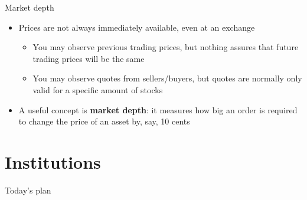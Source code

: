 \documentclass[english,10pt
,aspectratio=169
]{beamer}
\begin{document}
\begin{frame}{Market depth}
\begin{itemize}
	\item Prices are not always immediately available, even at an exchange
	\begin{itemize}
		\item You may observe previous trading prices, but nothing assures that future trading prices will be the same
		\item You may observe quotes from sellers/buyers, but quotes are normally only valid for a specific amount of stocks
	\end{itemize}
	\item A useful concept is \textbf{market depth}: it measures how big an order is required to change the price of an asset by, say, 10 cents
\end{itemize}
\end{frame}


%	



\section{Institutions}

\begin{frame}{Today's plan}
\tableofcontents[currentsection]
\end{frame}
\end{document}
